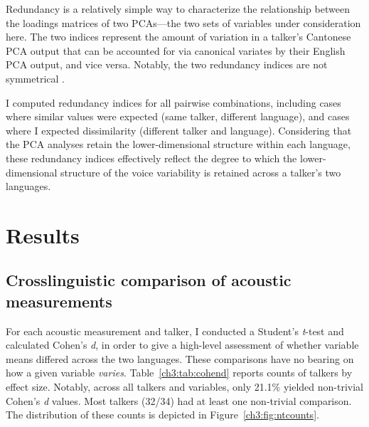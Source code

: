 Redundancy is a relatively simple way to characterize the relationship between the loadings matrices of two PCAs---the two sets of variables under consideration here. The two indices represent the amount of variation in a talker's Cantonese PCA output that can be accounted for via canonical variates by their English PCA output, and vice versa. Notably, the two redundancy indices are not symmetrical \citep{stewart_1968_canonical}.

I computed redundancy indices for all pairwise combinations, including cases where similar values were expected (same talker, different language), and cases where I expected dissimilarity (different talker and language). Considering that the PCA analyses retain the lower-dimensional structure within each language, these redundancy indices effectively reflect the degree to which the lower-dimensional structure of the voice variability is retained across a talker's two languages.

\section{Results}\label{ch3:sec:results}

\subsection{Crosslinguistic comparison of acoustic measurements}

For each acoustic measurement and talker, I conducted a Student's \textit{t}-test and calculated Cohen's \textit{d}, in order to give a high-level assessment of whether variable means differed across the two languages. These comparisons have no bearing on how a given variable \textit{varies}. Table~\ref{ch3:tab:cohend} reports counts of talkers by effect size. Notably, across all talkers and variables, only 21.1\% yielded non-trivial Cohen's \textit{d} values. Most talkers (32/34) had at least one non-trivial comparison. The distribution of these counts is depicted in Figure~\ref{ch3:fig:ntcounts}. 


